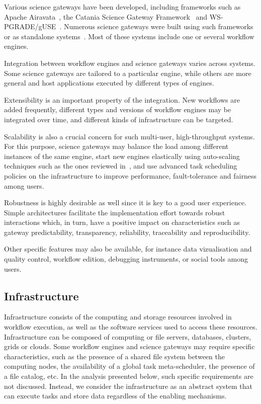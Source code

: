 \documentclass[preprint,3p,twocolumn]{elsarticle}
\begin{document}
Various science gateways have been developed, including frameworks
such as Apache Airavata~\cite{marru2011apache}, the Catania Science
Gateway Framework~\cite{ardizzone2012decide} and
WS-PGRADE/gUSE~\cite{Kacsuk2012}. Numerous science gateways were built
using such frameworks~\cite{kacsuk2014science,ardizzone2012decide} or
as standalone systems~\cite{SHER-14,GLAT-13}. Most of these systems
include one or several workflow engines.


Integration between workflow engines and science gateways varies
across systems. Some science gateways are tailored to a particular
engine, while others are more general and host applications
executed by different types of engines. %

Extensibility is an important property of the integration. New
workflows are added frequently, different types and versions of
workflow engines may be integrated over time, and different kinds of
infrastructure can be targeted. 

Scalability is also a crucial concern for such multi-user,
high-throughput systems. For this purpose, science gateways may
balance the load among different instances of the same engine, start
new engines elastically using auto-scaling techniques such as the ones
reviewed in~\cite{lorido2012auto}, and use advanced task scheduling
policies on the infrastructure to improve performance, fault-tolerance
and fairness among users.

Robustness is highly desirable as well since it is key to a
good user experience. Simple architectures facilitate the
implementation effort towards robust interactions which, in turn, have
a positive impact on characteristics such as gateway predictability,
transparency, reliability, traceability and
reproducibility. 

Other specific features may also be available, for instance
data vizualisation and quality control, workflow edition, debugging
instruments, or social tools among users. 

\subsection{Infrastructure}

Infrastructure consists of the computing and storage
resources involved in workflow execution, as well as the software
services used to access these resources. Infrastructure can be
composed of computing or file servers, databases, clusters, grids or
clouds. Some workflow engines and science gateways may require specific
characteristics, such as the presence of a shared file system between
the computing nodes, the availability of a global task meta-scheduler,
the presence of a file catalog, etc. In the analysis presented below,
such specific requirements are not discussed. Instead, we consider the
infrastructure as an abstract system that can execute tasks and store
data regardless of the enabling mechanisms.
\end{document}
